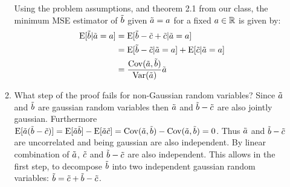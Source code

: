\documentclass[12pt,twoside]{article}
\begin{document}
\begin{enumerate}
\begin{enumerate}
  Using the problem assumptions, and theorem 2.1 from our class, the minimum MSE estimator of $\tilde{ b }$ given $\tilde{  a }=a$ for a fixed $a \in \mathbb{R}$ is given by:
  \begin{align*}
  	\E[\rb | \ra = a]		&=	\E[\rb-  \rnd{c} +  \rnd{c} | \ra= a]	\\
					&=	\E[\rb-  \rnd{c} | \ra= a] + \E[\rnd{c} | \ra= a] \\
					&=	\frac{\cov(\ra,\rb)}{\var(\ra)} \ra
  \end{align*}
  
  
  \item What step of the proof fails for non-Gaussian random variables?
  Since $\tilde{  a }$ and $\tilde{  b }$ are gaussian random variables then $\tilde{  a }$ and $\tilde{  b } -  \tilde{ c }$ are also jointly gaussian.
  Furthermore $\E[\ra (\rb-  \rnd{c})] = \E[\ra \rb] - \E[\ra \rnd{c}] = \cov(\ra,\rb) - \cov(\ra,\rb) = 0$. Thus $\tilde{  a }$ and $\tilde{  b } - \tilde{ c }$ are uncorrelated and being gaussian are also independent.
  By linear combination of $\tilde{  a }$, $\tilde{ c } $ and $\tilde{  b } - \tilde{ c }$ are also independent.
  This allows in the first step, to decompose $\tilde{  b }$ into two independent gaussian random variables: $\tilde{  b } =\tilde{ c }  + \tilde{  b } -  \tilde{ c }$.
  
  \end{enumerate} 
  

\end{enumerate}
\end{document}
